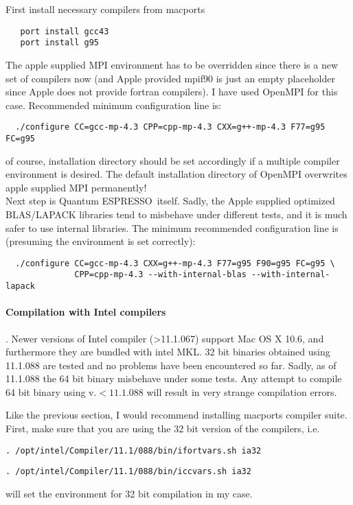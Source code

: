 \documentclass[12pt,a4paper]{article}
\def\qe{{\sc Quantum ESPRESSO}}
\begin{document}
First install necessary compilers from macports
\begin{verbatim}
   port install gcc43
   port install g95
\end{verbatim}
The apple supplied MPI environment has to be overridden since there is
a new set of compilers now (and Apple provided mpif90 is just an empty 
placeholder since Apple does not provide fortran compilers). I have used
OpenMPI for this case. Recommended minimum configuration line is:
\begin{verbatim}
  ./configure CC=gcc-mp-4.3 CPP=cpp-mp-4.3 CXX=g++-mp-4.3 F77=g95 FC=g95
\end{verbatim}
of course, installation directory should be set accordingly if a multiple
compiler environment is desired. The default installation directory of 
OpenMPI overwrites apple supplied MPI permanently!\\
Next step is \qe\ itself. Sadly, the Apple supplied optimized BLAS/LAPACK
libraries tend to misbehave under different tests, and it is much safer to
use internal libraries. The minimum recommended configuration
line is (presuming the environment is set correctly):
\begin{verbatim}
  ./configure CC=gcc-mp-4.3 CXX=g++-mp-4.3 F77=g95 F90=g95 FC=g95 \
              CPP=cpp-mp-4.3 --with-internal-blas --with-internal-lapack
\end{verbatim}
\paragraph{Compilation with Intel compilers}.
Newer versions of Intel compiler (>11.1.067) support Mac OS X 10.6, and furthermore they are
bundled with intel MKL. 32 bit binaries obtained using 11.1.088 are tested and no problems
have been encountered so far. Sadly, as of 11.1.088 the 64 bit binary misbehave 
under some tests. Any attempt to compile 64 bit binary using v.$<11.1.088$ will result in
very strange compilation errors.   

Like the previous section, I would recommend installing macports compiler suite. 
First, make sure that you are using the 32 bit version of the compilers,
i.e.  
\begin{verbatim}
. /opt/intel/Compiler/11.1/088/bin/ifortvars.sh ia32
\end{verbatim}
\begin{verbatim}
. /opt/intel/Compiler/11.1/088/bin/iccvars.sh ia32
\end{verbatim}
will set the environment for 32 bit compilation in my case. 
\end{document}
